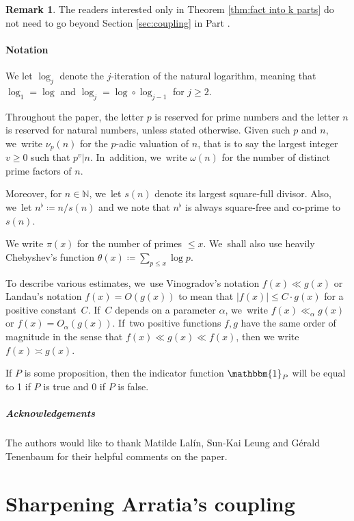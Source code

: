 \documentclass[JEP,XML,SOM,Unicode,published]{cedram}
\newcommand{\NN}{\mathbb{N}}
\newcommand{\one}{\mathbbm{1}}
\newcommand{\bigoo}[1]{O\!\left(#1 \right)}
\newcommand{\abs}[1]{\left\lvert #1 \right\rvert}
\theoremstyle{plain}
\theoremstyle{definition}
\newtheorem*{rems}{Remark}
\begin{document}
\begin{rems}
The readers interested only in Theorem \ref{thm:fact into k parts} do not need to go beyond Section \ref{sec:coupling} in Part \ref{part:Arratia}.
\end{rems}

\subsection{Notation}
We let $\log_j$ denote the $j$-iteration of the natural logarithm, meaning that $\log_1=\log$ and $\log_j=\log\circ \log_{j-1}$ for $j\ge2$.

Throughout the paper, the letter $p$ is reserved for prime numbers and the letter $n$ is reserved for natural numbers, unless stated otherwise. Given such $p$ and $n$, we~write $\nu_p(n)$ for the $p$-adic valuation of $n$, that is to say the largest integer $v\ge0$ such that $p^v|n$. In~addition, we~write $\omega(n)$ for the number of distinct prime factors of $n$.

Moreover, for $n\in\NN$, we~let $s(n)$ denote its largest square-full divisor. Also, we~let $n^\flat \coloneqq n/s(n)$ and we note that $n^\flat$ is always square-free and co-prime to $s(n)$.

We write $\pi(x)$ for the number of primes $\le x$. We~shall also use heavily Chebyshev's function $\theta(x) \coloneqq \sum_{p\le x}\log p$.

To describe various estimates, we~use Vinogradov's notation $f(x) \ll g(x)$ or Landau's notation $f(x) = \bigoo{g(x)}$ to mean that $\abs{f(x)} \le C\cdot g(x)$ for a positive constant~$C$. If~$C$ depends on a parameter $\alpha$, we~write $f(x) \ll_\alpha g(x)$ or $f(x) = O_\alpha(g(x))$. If~two positive functions $f, g$ have the same order of magnitude in the sense that $f(x) \ll g(x) \ll f(x)$, then we write $f(x) \asymp g(x)$.

If $P$ is some proposition, then the indicator function $\one _P$ will be equal to 1 if $P$ is true and $0$ if $P$ is false.

\subsubsection*{Acknowledgements}
The authors would like to thank Matilde Lalín, Sun-Kai Leung and Gérald Tenenbaum for their helpful comments on the paper.

\part{Sharpening Arratia's coupling}\label{part:Arratia}
\end{document}
